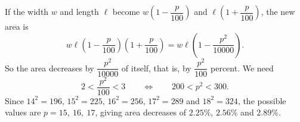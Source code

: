 If the width $w$ and length $\ell$ become $w\left(1-\dfrac{p}{100}\right)$ and $\ell\left(1+\dfrac{p}{100}\right)$, the new area is
\[
w\ell\left(1-\dfrac{p}{100}\right)\left(1+\dfrac{p}{100}\right)=w\ell\left(1-\dfrac{p^2}{10000}\right).
\]
So the area decreases by $\dfrac{p^2}{10000}$ of itself, that is, by $\dfrac{p^2}{100}$ percent. We need
\[
2<\dfrac{p^2}{100}<3\qquad\Longleftrightarrow\qquad 200<p^2<300 .
\]
Since $14^2=196$, $15^2=225$, $16^2=256$, $17^2=289$ and $18^2=324$, the possible values are $p=\boxed{15,\ 16,\ 17}$, giving area decreases of $2.25\%$, $2.56\%$ and $2.89\%$.
